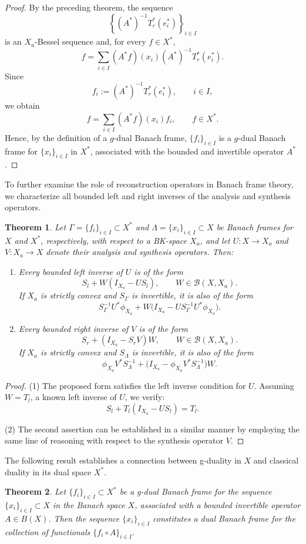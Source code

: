 \documentclass[12pt]{article}
\newtheorem{theorem}{Theorem}[section]
\theoremstyle{definition}
\theoremstyle{remark}
\begin{document}
\begin{proof}
	By the preceding theorem, the sequence
	\[
	\left\{(A^*)^{-1}T_r^*(e_i^*)\right\}_{i\in I}
	\]
	is an \(X_a\)-Bessel sequence and, for every \(f\in X^*\),
	\[
	f
	=
	\sum_{i\in I}(A^*f)(x_i)(A^*)^{-1}T_r^*(e_i^*).
	\]
	Since
	\[
	f_i:=(A^*)^{-1}T_r^*(e_i^*),
	\qquad i\in I,
	\]
	we obtain
	\[
	f=\sum_{i\in I}(A^*f)(x_i)f_i,
	\qquad f\in X^*.
	\]
	Hence, by the definition of a \(g\)-dual Banach frame,
	\(\{f_i\}_{i\in I}\) is a \(g\)-dual Banach frame for
	\(\{x_i\}_{i\in I}\) in \(X^*\), associated with the bounded and
	invertible operator \(A^*\).
\end{proof}
\noindent

To further examine the role of reconstruction operators in Banach frame
theory, we characterize all bounded left and right inverses of the
analysis and synthesis operators.
\begin{theorem}
	Let \(\Gamma=\{f_i\}_{i\in I}\subset X^*\) and
	\(\Lambda=\{x_i\}_{i\in I}\subset X\) be Banach frames for \(X\) and
	\(X^*\), respectively, with respect to a BK-space \(X_a\), and let
	\(U:X\to X_a\) and \(V:X_a\to X\) denote their analysis and synthesis
	operators. Then:
	
	\begin{enumerate}
		\item Every bounded left inverse of \(U\) is of the form
		\[
		S_l+W(I_{X_a}-US_l),
		\qquad W\in\mathcal{B}(X,X_a).
		\]
		If \(X_a\) is strictly convex and \(S_\Gamma\) is invertible, it is
		also of the form
		\[
		S_\Gamma^{-1}U^*\phi_{X_a}
		+W\bigl(I_{X_a}-US_\Gamma^{-1}U^*\phi_{X_a}\bigr).
		\]
		
		\item Every bounded right inverse of \(V\) is of the form
		\[
		S_r+(I_{X_a}-S_rV)W,
		\qquad W\in\mathcal{B}(X,X_a).
		\]
		If \(X_a\) is strictly convex and \(S_\Lambda\) is invertible, it is
		also of the form
		\[
		\phi_{X_a}V^*S_\Lambda^{-1}
		+\bigl(I_{X_a}-\phi_{X_a}V^*S_\Lambda^{-1}\bigr)W.
		\]
	\end{enumerate}
\end{theorem}
\begin{proof}
(1) The proposed form satisfies the left inverse condition for \( U \).  
Assuming \( W = T_l \), a known left inverse of \( U \), we verify:
\[
S_l + T_l (I_{X_a} - U S_l) = T_l.
\]

(2) The second assertion can be established in a similar manner by employing the same line of reasoning with respect to the synthesis operator \( V \).
\end{proof}
\noindent
The following result establishes a connection between g-duality in \( X \) and classical duality in its dual space \( X^* \).
\begin{theorem}
Let \( \{f_i\}_{i \in I} \subset X^* \) be a g-dual Banach frame for the sequence \( \{x_i\}_{i \in I} \subset X \) in the Banach space \( X \), associated with a bounded invertible operator \( A \in B(X) \). Then the sequence \( \{x_i\}_{i \in I} \) constitutes a dual Banach frame for the collection of functionals \( \{f_i \circ A\}_{i \in I} \).
\end{theorem}
\end{document}
